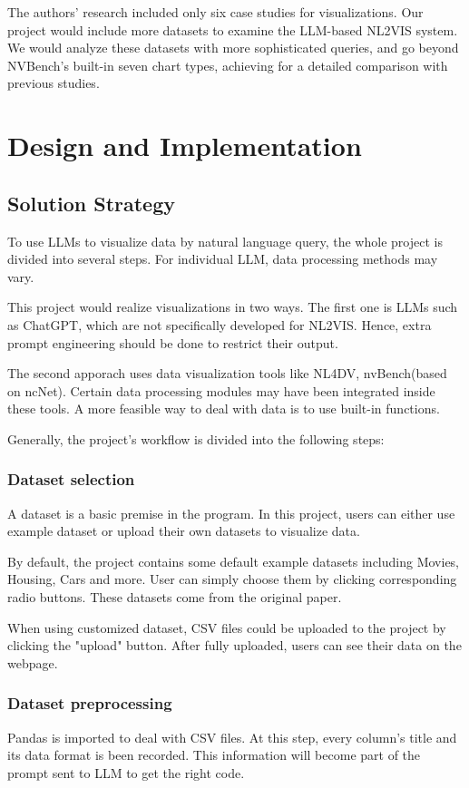 \documentclass[conference]{IEEEtran}
\begin{document}
The authors’ research included only six case studies for visualizations. Our project would include more datasets to examine the LLM-based NL2VIS system. We would analyze these datasets with more sophisticated queries, and go beyond NVBench’s built-in seven chart types, achieving for a detailed comparison with previous studies.


\section{Design and Implementation}
\subsection{Solution Strategy}
To use LLMs to visualize data by natural language query, the whole project is divided into several steps. For individual LLM, data processing methods may vary.

This project would realize visualizations in two ways. The first one is LLMs such as ChatGPT, which are not specifically developed for NL2VIS. Hence, extra prompt engineering should be done to restrict their output.

The second apporach uses data visualization tools like NL4DV, nvBench(based on ncNet). Certain data processing modules may have been integrated inside these tools\cite{narechania2021nl4dv,luo2021nvbench}. A more feasible way to deal with data is to use built-in functions. 

Generally, the project's workflow is divided into the following steps:   

\subsubsection{Dataset selection}
A dataset is a basic premise in the program. In this project, users can either use example dataset or upload their own datasets to visualize data.

By default, the project contains some default example datasets including Movies, Housing, Cars and more. User can simply choose them by clicking corresponding radio buttons. These datasets come from the original paper.

When using customized dataset, CSV files could be uploaded to the project by clicking the "upload" button. After fully uploaded, users can see their data on the webpage.

\subsubsection{Dataset preprocessing}
Pandas is imported to deal with CSV files. At this step, every column's title and its data format is been recorded. This information will become part of the prompt sent to LLM to get the right code.
\end{document}
